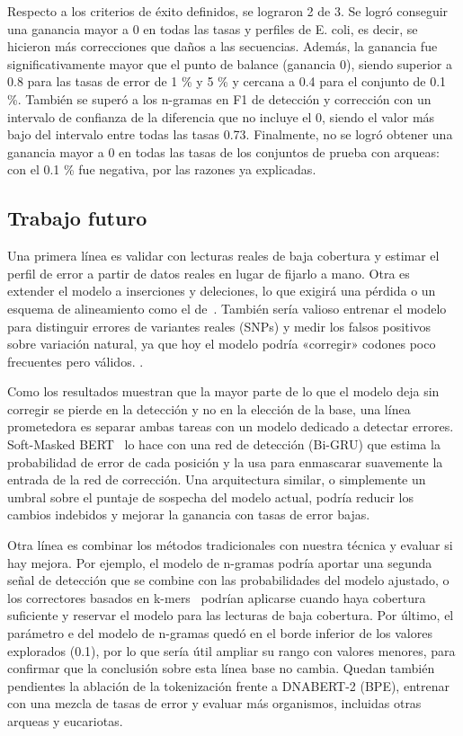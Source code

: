 \documentclass[sigconf,nonacm]{acmart}
\begin{document}
Respecto a los criterios de éxito definidos, se lograron 2 de 3. Se logró conseguir una ganancia mayor a 0 en todas las tasas y perfiles de E. coli, es decir, se hicieron más correcciones que daños a las secuencias. Además, la ganancia fue significativamente mayor que el punto de balance (ganancia 0), siendo superior a 0.8 para las tasas de error de 1 \% y 5 \% y cercana a 0.4 para el conjunto de 0.1 \%. También se superó a los n-gramas en F1 de detección y corrección con un intervalo de confianza de la diferencia que no incluye el 0, siendo el valor más bajo del intervalo entre todas las tasas 0.73. Finalmente, no se logró obtener una ganancia mayor a 0 en todas las tasas de los conjuntos de prueba con arqueas: con el 0.1 \% fue negativa, por las razones ya explicadas.

\subsection{Trabajo futuro}\label{sec:trabajo-futuro}

Una primera línea es validar con lecturas reales de baja cobertura y estimar el perfil de error a partir de datos reales en lugar de fijarlo a mano. Otra es extender el modelo a inserciones y deleciones, lo que exigirá una pérdida o un esquema de alineamiento como el de~\cite{baid2021deepconsensus}. También sería valioso entrenar el modelo para distinguir errores de variantes reales (SNPs) y medir los falsos positivos sobre variación natural, ya que hoy el modelo podría «corregir» codones poco frecuentes pero válidos. .

Como los resultados muestran que la mayor parte de lo que el modelo deja sin corregir se pierde en la detección y no en la elección de la base, una línea prometedora es separar ambas tareas con un modelo dedicado a detectar errores. Soft-Masked BERT~\cite{zhang2020spelling} lo hace con una red de detección (Bi-GRU) que estima la probabilidad de error de cada posición y la usa para enmascarar suavemente la entrada de la red de corrección. Una arquitectura similar, o simplemente un umbral sobre el puntaje de sospecha del modelo actual, podría reducir los cambios indebidos y mejorar la ganancia con tasas de error bajas.

Otra línea es combinar los métodos tradicionales con nuestra técnica y evaluar si hay mejora. Por ejemplo, el modelo de n-gramas podría aportar una segunda señal de detección que se combine con las probabilidades del modelo ajustado, o los correctores basados en k-mers~\cite{mitchell2020benchmarking} podrían aplicarse cuando haya cobertura suficiente y reservar el modelo para las lecturas de baja cobertura. Por último, el parámetro e del modelo de n-gramas quedó en el borde inferior de los valores explorados (0.1), por lo que sería útil ampliar su rango con valores menores, para confirmar que la conclusión sobre esta línea base no cambia. Quedan también pendientes la ablación de la tokenización frente a DNABERT-2 (BPE), entrenar con una mezcla de tasas de error y evaluar más organismos, incluidas otras arqueas y eucariotas.



\end{document}
